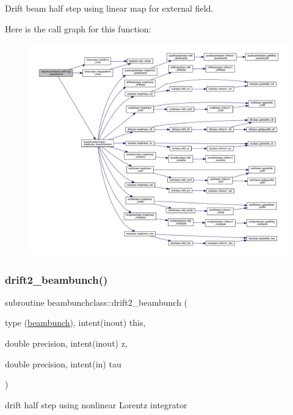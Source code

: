 Drift beam half step using linear map for external field. 

Here is the call graph for this function\+:\nopagebreak
\begin{figure}[H]
\begin{center}
\leavevmode
\includegraphics[width=350pt]{namespacebeambunchclass_a3be2b49f0fef567493258758c44fffd6_cgraph}
\end{center}
\end{figure}
\mbox{\label{namespacebeambunchclass_a6e3aecf1a2cf3d54950c09c603c2f11c}} 
\subsubsection{\texorpdfstring{drift2\_beambunch()}{drift2\_beambunch()}}
{\footnotesize\ttfamily subroutine beambunchclass\+::drift2\+\_\+beambunch (\begin{DoxyParamCaption}\item[{type (\mbox{\hyperlink{namespacebeambunchclass_structbeambunchclass_1_1beambunch}{beambunch}}), intent(inout)}]{this,  }\item[{double precision, intent(inout)}]{z,  }\item[{double precision, intent(in)}]{tau }\end{DoxyParamCaption})}



drift half step using nonlinear Lorentz integrator 

